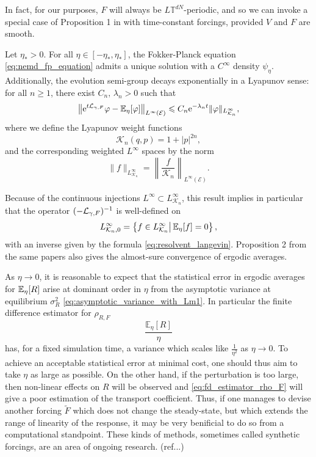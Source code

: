 In fact, for our purposes, $F$ will always be $L\mathbb{T}^{dN}$-periodic, and so we can invoke a special case of Proposition 1 in \cite{JPS15} with time-constant forcings, provided $V$ and $F$ are smooth.
\begin{theorem}\label{thm:nemd_exst_invariant_measure}
    Let $\eta_*>0$. For all $\eta\in[-\eta_*,\eta_*]$, the Fokker-Planck equation \eqref{eq:nemd_fp_equation} admits a unique solution with a $C^\infty$ density $\psi_\eta$.
    Additionally, the evolution semi-group decays exponentially in a Lyapunov sense: for all $n\geq 1$, there exist $C_n,\,\lambda_n>0$ such that
    \begin{equation}
        \label{eq:lyapunov_exp_decay}
        \left\|\mathrm{e}^{t\mathcal{L}_{\gamma,F}}\varphi-\mathbb{E}_\eta[\varphi]\right\|_{L^{\infty}(\mathcal E)}\leqslant C_n\mathrm{e}^{-\lambda_n t}\|\varphi\|_{L^\infty_{\mathcal K_n}},
    \end{equation}
    where we define the Lyapunov weight functions
    \[\mathcal K_n(q,p)=1+|p|^{2n},\]
    and the corresponding weighted $L^{\infty}$ spaces by the norm
    \[\|f\|_{L^\infty_{\mathcal K_n}}=\left\|\frac{f}{\mathcal K_n}\right\|_{L^\infty(\mathcal E)}.\]
\end{theorem}
Because of the continuous injections $L^\infty \subset L^\infty_{\mathcal K_n}$, this result implies in particular that the operator 
$(-\mathcal{L}_{\gamma,F})^{-1}$ is well-defined on 
\[L^\infty_{\mathcal K_n,0}=\left\{f\in L^\infty_{\mathcal K_n}\middle|\,\mathbb{E}_\eta[f]=0\right\},\]
with an inverse given by the formula \eqref{eq:resolvent_langevin}. Proposition 2 from the same papers also gives the almost-sure convergence of ergodic averages.
 \begin{remark}
    As $\eta \to 0$, it is reasonable to expect that the statistical error in ergodic averages for
    $\mathbb{E}_\eta[R]$ arise at dominant order in $\eta$ from the asymptotic variance at equilibrium $\sigma^2_R$ \eqref{eq:asymptotic_variance_with_Lm1}.
    In particular the finite difference estimator for $\rho_{R,F}$
    \begin{equation}
        \label{eq:fd_estimator_rho_F}
        \frac{\mathbb{E}_\eta[R]}{\eta}
    \end{equation}
    has, for a fixed simulation time, a variance which scales like $\frac1{\eta^2}$ as $\eta\to 0$.
    To achieve an acceptable statistical error at minimal cost, one should thus aim to take $\eta$ as large as possible.
    On the other hand, if the perturbation is too large, then non-linear effects on $R$ will be observed and \eqref{eq:fd_estimator_rho_F} 
    will give a poor estimation of the transport coefficient.
    Thus, if one manages to devise another forcing $\tilde F$ which does not change the steady-state, but which extends the range of linearity of the response,
    it may be very benificial to do so from a computational standpoint. These kinds of methods, sometimes called synthetic forcings, are an area of ongoing research. (ref...)
 \end{remark}
